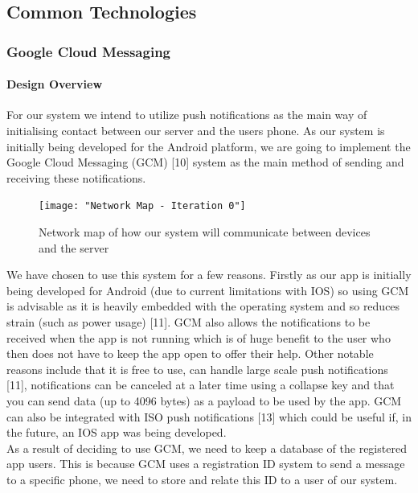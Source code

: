 \documentclass{article}
\begin{document}
	\subsection{Common Technologies}
	
		\subsubsection{Google Cloud Messaging}
	
		\paragraph{Design Overview}
		For our system we intend to utilize push notifications as the main way of initialising contact between our server and the users phone. As our system is initially being developed for the Android platform, we are going to implement the Google Cloud Messaging (GCM) [10] system as the main method of sending and receiving these notifications.\\
		
	\begin{figure}[H]
		\centering
		\texttt{[image: "Network Map - 	Iteration 0"]}
		\caption{Network map of how our system will communicate between devices and the server}
	\end{figure}
	
		We have chosen to use this system for a few reasons. Firstly as our app is initially being developed for Android (due to current limitations with IOS) so using GCM is advisable as it is heavily embedded with the operating system and so reduces strain (such as power usage) [11]. GCM also allows the notifications to be received when the app is not running which is of huge benefit to the user who then does not have to keep the app open to offer their help. Other notable reasons include that it is free to use, can handle large scale push notifications [11], notifications can be canceled at a later time using a collapse key and that you can send data (up to 4096 bytes) as a payload to be used by the app. GCM can also be integrated with ISO push notifications [13] which could be useful if, in the future, an IOS app was being developed.\\

		As a result of deciding to use GCM, we need to keep a database of the registered app users. This is because GCM uses a registration ID system to send a message to a specific phone, we need to store and relate this ID to a user of our system.\\
		
\end{document}
